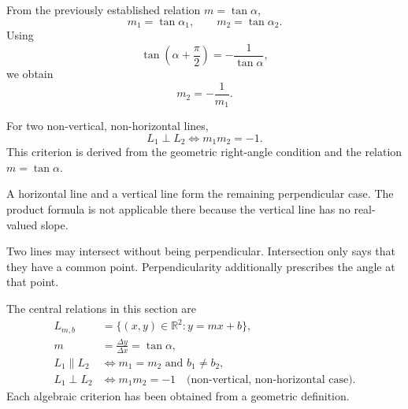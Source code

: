 From the previously established relation $m=\tan\alpha$,
\[
m_1=\tan\alpha_1,
\qquad
m_2=\tan\alpha_2.
\]
Using
\[
\tan\left(\alpha+\frac{\pi}{2}\right)
=-\frac{1}{\tan\alpha},
\]
we obtain
\[
m_2=-\frac{1}{m_1}.
\]

\begin{theorembox}
For two non-vertical, non-horizontal lines,
\[
\boxed{L_1\perp L_2
\iff
m_1m_2=-1.}
\]
This criterion is derived from the geometric right-angle condition and the
relation $m=\tan\alpha$.
\end{theorembox}

A horizontal line and a vertical line form the remaining perpendicular case.
The product formula is not applicable there because the vertical line has no
real-valued slope.

\begin{remarkbox}
Two lines may intersect without being perpendicular. Intersection only says
that they have a common point. Perpendicularity additionally prescribes the
angle at that point.
\end{remarkbox}

\begin{summarybox}
The central relations in this section are
\[
\begin{aligned}
L_{m,b}&=\{(x,y)\in\mathbb{R}^2:y=mx+b\},\\[2mm]
m&=\frac{\Delta y}{\Delta x}=\tan\alpha,\\[2mm]
L_1\parallel L_2&\iff m_1=m_2\text{ and }b_1\neq b_2,\\[2mm]
L_1\perp L_2&\iff m_1m_2=-1
\quad\text{(non-vertical, non-horizontal case).}
\end{aligned}
\]
Each algebraic criterion has been obtained from a geometric definition.
\end{summarybox}